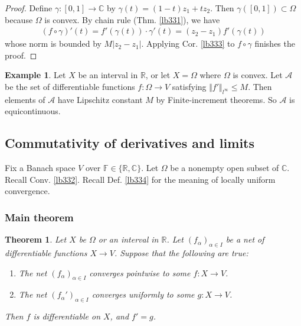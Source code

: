 \documentclass[12pt,b5paper,notitlepage]{article}
\theoremstyle{definition}
\newtheorem{eg}[df]{Example}
\theoremstyle{plain}
\newtheorem{thm}[df]{Theorem}
\newcommand{\scr}{\mathscr}
\newcommand{\Cbb}{\mathbb C}
\newcommand{\Rbb}{\mathbb R}
\newcommand{\Fbb}{\mathbb F}
\numberwithin{equation}{section}
\begin{document}
\begin{proof}
Define $\gamma:[0,1]\rightarrow \Cbb$ by $\gamma(t)=(1-t)z_1+tz_2$. Then $\gamma([0,1])\subset\Omega$ because $\Omega$ is convex. By chain rule (Thm. \ref{lb331}), we have
\begin{align*}
(f\circ\gamma)'(t)=f'(\gamma(t))\cdot \gamma'(t)=(z_2-z_1)f'(\gamma(t))
\end{align*}
whose norm is bounded by $M|z_2-z_1|$. Applying Cor. \ref{lb333} to $f\circ\gamma$ finishes the proof.
\end{proof}





\begin{eg}
Let $X$ be an interval in $\Rbb$, or let $X=\Omega$ where $\Omega$ is convex. Let $\scr A$ be the set of differentiable functions $f:\Omega\rightarrow V$ satisfying $\Vert f'\Vert_{l^\infty}\leq M$. Then elements of $\scr A$ have Lipschitz constant $M$ by Finite-increment theorems. So $\scr A$ is equicontinuous.
\end{eg}







\subsection{Commutativity of derivatives and limits}

Fix a Banach space $V$ over $\Fbb\in\{\Rbb,\Cbb\}$. Let $\Omega$ be a nonempty open subset of $\Cbb$. Recall Conv. \ref{lb332}. Recall Def. \ref{lb334} for the meaning of locally uniform convergence.


\subsubsection{Main theorem}




\begin{thm}\label{lb336}
Let $X$ be $\Omega$ or an interval in $\Rbb$. Let $(f_\alpha)_{\alpha\in I}$ be a net of differentiable functions $X\rightarrow V$. Suppose that the following are true:
\begin{enumerate}[label=(\alph*)]
\item The net $(f_\alpha)_{\alpha\in I}$ converges pointwise to some $f:X\rightarrow V$.
\item The net $(f_\alpha')_{\alpha\in I}$ converges uniformly to some $g:X\rightarrow V$. 
\end{enumerate}
Then $f$ is differentiable on $X$, and $f'=g$.
\end{thm}
\end{document}
